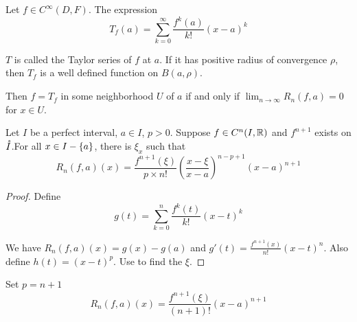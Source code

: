 \begin{definition}\label{taylor_series}
    Let $f \in C^\infty (D, F)$. The expression
    \begin{equation}
        T_f (a) = \sum_{k=0}^\infty \frac{f^k(a)}{k!}(x-a)^k
    \end{equation}
    
    $T$ is called the Taylor series of $f$ at $a$. If it has positive radius of convergence $\rho$, then $T_f$ is a well defined function on $B(a,\rho)$. 
    
    Then $f = T_f$ in some neighborhood $U$ of $a$ if and only if $\displaystyle \lim_{n \rightarrow \infty} R_n(f,a) = 0$ for $x \in U$.
\end{definition}

\begin{theorem}
    Let $I$ be a perfect interval, $a \in I$, $p > 0$. Suppose $f \in C^n(I, \mathbb{R})$ and $f^{n+1}$ exists on $\mathring{I}$.For all $x \in I - \set{a}$, there is $\xi_x$ such that
    \begin{equation}
        R_n(f,a)(x) = \frac{f^{n+1}(\xi)}{p \times n!}\left( \frac{x-\xi}{x-a} \right)^{n-p+1} (x-a)^{n+1}
    \end{equation}
\end{theorem}
\begin{proof}
    Define
    \begin{equation}
        g(t) = \sum_{k=0}^n \frac{f^k (t)}{k!}(x-t)^k
    \end{equation}
    
    We have $R_n (f,a)(x) = g(x) - g(a)$ and $g'(t) = \frac{f^{n+1}(x)}{n!}(x-t)^n$. Also define $h(t) = (x-t)^p$. Use  to find the $\xi$.
\end{proof}

\begin{theorem}
    Set $p = n+1$
    \begin{equation}
        R_n (f,a)(x) = \frac{f^{n+1}(\xi)}{(n+1)!}(x-a)^{n+1}
    \end{equation}
\end{theorem}


